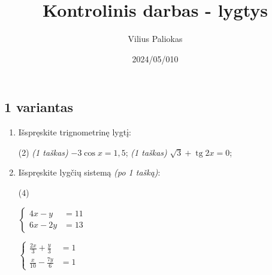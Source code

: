 \documentclass[a4paper]{article}
\title{Kontrolinis darbas - lygtys}
\author{Vilius Paliokas}
\date{2024/05/010}
\DeclareMathOperator{\tg}{tg}
\begin{document}
\thispagestyle{fancy}

\titlespacing*{\subsection}{0pt}{.75ex}{0.75ex}

\subsection*{1 variantas}

\begin{enumerate}
      \item Išspręskite trignometrinę lygtį:
            \begin{tasks}[item-format={\normalfont}, after-item-skip=4mm](2)
                  \task \textit{(1 taškas)} $-3\cos{x}=1,5$;
                  \task \textit{(1 taškas)} $\sqrt{3}+\tg{2x}=0$;
            \end{tasks}

      \item Išspręskite lygčių sistemą \textit{(po 1 tašką)}:
            \begin{tasks}[item-format={\normalfont}, after-item-skip=4mm](4)
                  \task   \par\vspace{-1.3\baselineskip}%
                  $\left\{\begin{aligned}
                              4x - y  & = 11 \\
                              6x - 2y & = 13
                        \end{aligned}\right.$

                  \task   \par\vspace{-1.3\baselineskip}%
                  $\left\{\begin{aligned}
                              \frac{2x}{3} + \frac{y}{3}  & = 1 \\
                              \frac{x}{10} - \frac{7y}{6} & = 1
                        \end{aligned}\right.$


\end{tasks}
\end{enumerate}
\end{document}
